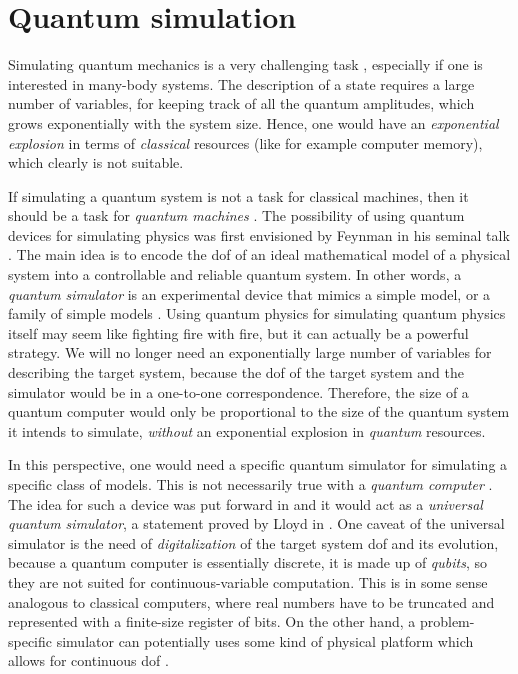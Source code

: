 \section{Quantum simulation}
\label{sec:quantum_simulation}

Simulating quantum mechanics is a very challenging task \cite{manin1980computable, feynman1982simulation}, especially if one is interested in many-body systems.
The description of a state requires a large number of variables, for keeping track of all the quantum amplitudes, which grows exponentially with the system size.
Hence, one would have an \emph{exponential explosion} in terms of \emph{classical} resources (like for example computer memory), which clearly is not suitable.

If simulating a quantum system is not a task for classical machines, then it should be a task for \emph{quantum machines} \cite{feynman1982simulation, georgescu2014simulation, hauke2012simulators, kendon2010quantum, buluta2009simulators, cirac2012goals}.
The possibility of using quantum devices for simulating physics was first envisioned by Feynman in his seminal talk \cite{feynman1982simulation}.
The main idea is to encode the \ac{dof} of an ideal mathematical model of a physical system into a controllable and reliable quantum system.
In other words, a \emph{quantum simulator} is an experimental device that mimics a simple model, or a family of simple models \cite{hauke2012simulators}.
Using quantum physics for simulating quantum physics itself may seem like fighting fire with fire, but it can actually be a powerful strategy.
We will no longer need an exponentially large number of variables for describing the target system, because the \ac{dof} of the target system and the simulator would be in a one-to-one correspondence.
Therefore, the size of a quantum computer would only be proportional to the size of the quantum system it intends to simulate, \emph{without} an exponential explosion in \emph{quantum} resources.

In this perspective, one would need a specific quantum simulator for simulating a specific class of models.
This is not necessarily true with a \emph{quantum computer} \cite{feynman1985quantum, nielsen2010quantum, schleich2007elements, stolze2008quantum}.
The idea for such a device was put forward in \cite{manin1980computable, feynman1982simulation, feynman1985quantum} and it would act as a \emph{universal quantum simulator}, a statement proved by Lloyd in \cite{lloyd1996simulator}.
One caveat of the universal simulator is the need of \emph{digitalization} of the target system \ac{dof} and its evolution, because a quantum computer is essentially discrete, it is made up of \emph{qubits}, so they are not suited for continuous-variable computation.
This is in some sense analogous to classical computers, where real numbers have to be truncated and represented with a finite-size register of bits.
On the other hand, a problem-specific simulator can potentially uses some kind of physical platform which allows for continuous \ac{dof} \cite{kendon2010quantum, wagner2010continuous}.

